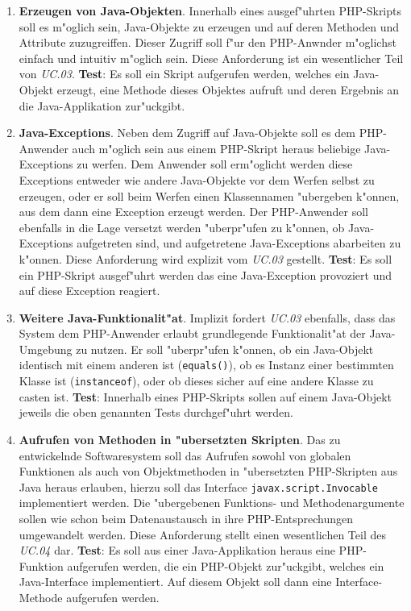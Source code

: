 \begin{enumerate}
\item \textbf{Erzeugen von Java-Objekten}. Innerhalb eines ausgef"uhrten PHP-Skripts soll es m"oglich sein, Java-Objekte zu erzeugen und auf
    deren Methoden und Attribute zuzugreiffen. Dieser Zugriff soll f"ur den PHP-Anwnder m"oglichst einfach und intuitiv m"oglich sein.
    Diese Anforderung ist ein wesentlicher Teil von \emph{UC.03}.
    \textbf{Test}: Es soll ein Skript aufgerufen werden, welches ein Java-Objekt erzeugt, eine Methode dieses Objektes aufruft und
    deren Ergebnis an die Java-Applikation zur"uckgibt.

\item \textbf{Java-Exceptions}. Neben dem Zugriff auf Java-Objekte soll es dem PHP-Anwender auch m"oglich sein aus einem
    PHP-Skript heraus beliebige Java-Exceptions zu werfen. 
    Dem Anwender soll erm"oglicht werden diese Exceptions entweder wie andere Java-Objekte vor dem Werfen selbst zu erzeugen,
    oder er soll beim Werfen einen Klassennamen "ubergeben k"onnen, aus dem dann eine Exception erzeugt werden. 
    Der PHP-Anwender soll ebenfalls in die Lage versetzt werden 
    "uberpr"ufen zu k"onnen, ob Java-Exceptions aufgetreten sind, und aufgetretene Java-Exceptions abarbeiten zu k"onnen.
    Diese Anforderung wird explizit vom \emph{UC.03} gestellt.
    \textbf{Test}: Es soll ein PHP-Skript ausgef"uhrt werden das eine Java-Exception provoziert und auf diese Exception reagiert.

\item \textbf{Weitere Java-Funktionalit"at}. Implizit fordert \emph{UC.03} ebenfalls, dass das System dem PHP-Anwender erlaubt grundlegende
    Funktionalit"at der Java-Umgebung zu nutzen. Er soll "uberpr"ufen k"onnen, ob ein Java-Objekt identisch mit einem anderen ist
    (\texttt{equals()}), ob es Instanz einer bestimmten Klasse ist (\texttt{instanceof}), oder ob dieses sicher auf eine andere Klasse zu casten ist.
    \textbf{Test}: Innerhalb eines PHP-Skripts sollen auf einem Java-Objekt jeweils die oben genannten Tests durchgef"uhrt werden.

\item \textbf{Aufrufen von Methoden in "ubersetzten Skripten}. Das zu entwickelnde Softwaresystem soll das Aufrufen sowohl von globalen Funktionen
    als auch von Objektmethoden in "ubersetzten PHP-Skripten aus Java heraus erlauben, hierzu soll das Interface \texttt{javax.script.Invocable} 
    implementiert werden. Die "ubergebenen Funktions- und Methodenargumente sollen wie schon beim Datenaustausch in ihre PHP-Entsprechungen
    umgewandelt werden. Diese Anforderung stellt einen wesentlichen Teil des \emph{UC.04} dar.
    \textbf{Test}: Es soll aus einer Java-Applikation heraus eine PHP-Funktion aufgerufen werden, die ein PHP-Objekt zur"uckgibt, welches
    ein Java-Interface implementiert. Auf diesem Objekt soll dann eine Interface-Methode aufgerufen werden.


\end{enumerate}
